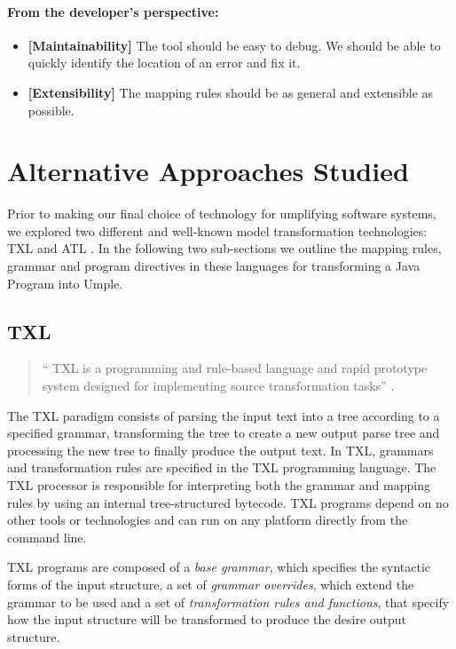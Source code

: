 \paragraph*{From the developer's perspective:}
\begin{itemize}
\item \textbf{[Maintainability]} The tool should be easy to debug. We should be able to quickly identify the location of an error and fix it.

\item \textbf{[Extensibility]} The mapping rules should be as general and extensible as possible. 
\end{itemize}


\section{Alternative Approaches Studied}
Prior to making our final choice of technology for umplifying software systems, we explored two different and well-known model transformation technologies: TXL \cite{Cordy2006} and ATL \cite{atl}. In the following two sub-sections we outline the mapping rules, grammar and program directives in these languages for transforming a Java Program into Umple. 

\subsection{TXL}

\begin{quote}`` TXL is a programming and rule-based language and rapid prototype system designed for implementing source transformation tasks'' \cite{Cordy2006}. \end{quote}

The TXL paradigm consists of parsing the input text into a tree according to a specified grammar, transforming the tree to create a new output parse tree and processing the new tree to finally produce the output text. In TXL, grammars and transformation rules are specified in the TXL programming language. The TXL processor is responsible for interpreting both the grammar and mapping rules by using an internal tree-structured bytecode. TXL programs depend on no other tools or technologies and can run on any platform directly from the command line.

TXL programs are composed of a \textit{base grammar}, which specifies the syntactic forms of the input structure, a set of \textit{grammar overrides}, which extend the grammar to be used and a set of \textit{transformation rules and functions}, that specify how the input structure will be transformed to produce the desire output structure.

